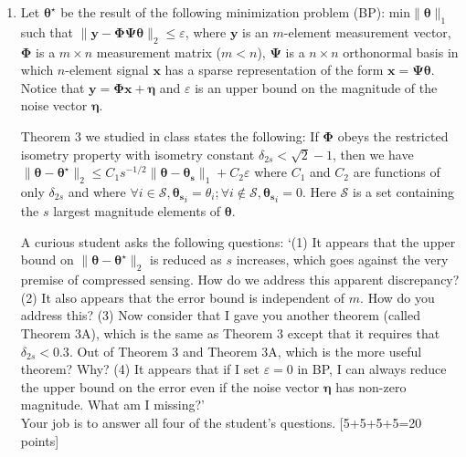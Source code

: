 \documentclass[11pt]{article}
\begin{document}
\begin{enumerate}
\item Let $\boldsymbol{\theta^{\star}}$ be the result of the following minimization problem (BP): $\textrm{min} \|\boldsymbol{\theta}\|_1$ such that $\|\boldsymbol{y}-\boldsymbol{\Phi \Psi \theta}\|_2 \leq \varepsilon$, where $\boldsymbol{y}$ is an $m$-element measurement vector, $\boldsymbol{\Phi}$ is a $m \times n$ measurement matrix ($m < n$), $\boldsymbol{\Psi}$ is a $n \times n$ orthonormal basis in which $n$-element signal $\boldsymbol{x}$ has a sparse representation of the form $\boldsymbol{x} = \boldsymbol{\Psi \theta}$. Notice that $\boldsymbol{y} = \boldsymbol{\Phi x} + \boldsymbol{\eta}$ and $\varepsilon$ is an upper bound on the magnitude of the noise vector $\boldsymbol{\eta}$.

Theorem 3 we studied in class states the following: If $\boldsymbol{\Phi}$ obeys the restricted isometry property with isometry constant $\delta_{2s} < \sqrt{2}-1$, then we have $\|\boldsymbol{\theta} - \boldsymbol{\theta^{\star}}\|_2 \leq C_1 s^{-1/2}\|\boldsymbol{\theta}-\boldsymbol{\theta_s}\|_1 + C_2 \varepsilon$ where $C_1$ and $C_2$ are functions of only $\delta_{2s}$ and where $\forall i \in \mathcal{S}, \boldsymbol{\theta_s}_i = \theta_i; \forall i \notin \mathcal{S}, \boldsymbol{\theta_s}_i = 0$. Here $\mathcal{S}$ is a set containing the $s$ largest magnitude elements of $\boldsymbol{\theta}$. 

A curious student asks the following questions: `(1) It appears that the upper bound on $\|\boldsymbol{\theta} - \boldsymbol{\theta^{\star}}\|_2$ is reduced as $s$ increases, which goes against the very premise of compressed sensing. How do we address this apparent discrepancy? (2) It also appears that the error bound is independent of $m$. How do you address this? (3) Now consider that I gave you another theorem (called Theorem 3A), which is the same as Theorem 3 except that it requires that $\delta_{2s} < 0.3$. Out of Theorem 3 and Theorem 3A, which is the more useful theorem? Why? (4) It appears that if I set $\varepsilon = 0$ in BP, I can always reduce the upper bound on the error even if the noise vector $\boldsymbol{\eta}$ has non-zero magnitude. What am I missing?'
\\
Your job is to answer all four of the student's questions. \textsf{[5+5+5+5=20 points]}


\end{enumerate}
\end{document}
